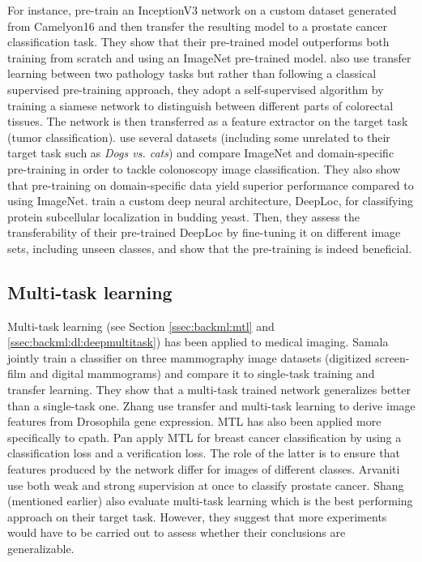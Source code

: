 For instance, \citeauthor{khan2019improving} \cite{khan2019improving} pre-train an InceptionV3 network on a custom dataset generated from Camelyon16 and then transfer the resulting model to a prostate cancer classification task. They show that their pre-trained model outperforms both training from scratch and using an ImageNet pre-trained model. \citeauthor{medela2019few} \cite{medela2019few} also use transfer learning between two pathology tasks but rather than following a classical supervised pre-training approach, they adopt a self-supervised algorithm by training a siamese network to distinguish between different parts of colorectal tissues. The network is then transferred as a feature extractor on the target task (tumor classification). \citeauthor{shang2019and} \cite{shang2019and} use several datasets (including some unrelated to their target task such as \textit{Dogs vs. cats}) and compare ImageNet and domain-specific pre-training in order to tackle colonoscopy image classification. They also show that pre-training on domain-specific data yield superior performance compared to using ImageNet. \citeauthor{kraus2017automated} \cite{kraus2017automated} train a custom deep neural architecture, DeepLoc, for classifying protein subcellular localization in budding yeast. Then, they assess the transferability of their pre-trained DeepLoc by fine-tuning it on different image sets, including unseen classes, and show that the pre-training is indeed beneficial.

\subsection{Multi-task learning}
\label{ssec:backdp:mtl}

Multi-task learning (see Section \ref{ssec:backml:mtl} and \ref{ssec:backml:dl:deepmultitask}) has been applied to medical imaging. Samala \etal \cite{samala2017multi} jointly train a classifier on three mammography image datasets (digitized screen-film and digital mammograms) and compare it to single-task training and transfer learning. They show that a multi-task trained network generalizes better than a single-task one. Zhang \etal \cite{zhang2016deep} use transfer and multi-task learning to derive image features from Drosophila gene expression. MTL has also been applied more specifically to \acrlong{cpath}. Pan \etal \cite{pan2018multi} apply MTL for breast cancer classification by using a classification loss and a verification loss. The role of the latter is to ensure that features produced by the network differ for images of different classes. Arvaniti \etal \cite{arvaniti2018coupling} use both weak and strong supervision at once to classify prostate cancer. Shang \etal (mentioned earlier) also evaluate multi-task learning which is the best performing approach on their target task. However, they suggest that more experiments would have to be carried out to assess whether their conclusions are generalizable.

